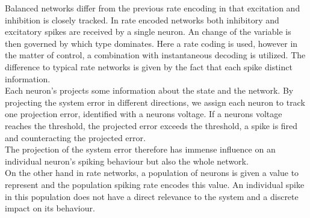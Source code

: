 Balanced networks differ from the previous rate encoding in that excitation and inhibition is closely tracked. In rate encoded networks both inhibitory and excitatory spikes are received by a single neuron. An change of the variable is then governed by which type dominates. Here a rate coding is used, however in the matter of control, a combination with instantaneous decoding is \cite{johnson_minimum-error_2016} utilized. The difference to typical rate networks is given by the fact that each spike distinct information.\\
Each neuron's projects some information about the state and the network. By projecting the system error in different directions, we assign each neuron to track one projection error, identified with a neurons voltage. If a neurons voltage reaches the threshold, the projected error exceeds the threshold, a spike is fired and counteracting the projected error.\\
The projection of the system error therefore has immense influence on an individual neuron's spiking behaviour but also the whole network.\\
On the other hand in rate networks, a population of neurons is given a value to represent and the population spiking rate encodes this value. An individual spike in this population does not have a direct relevance to the system and a discrete impact on its behaviour.\\



